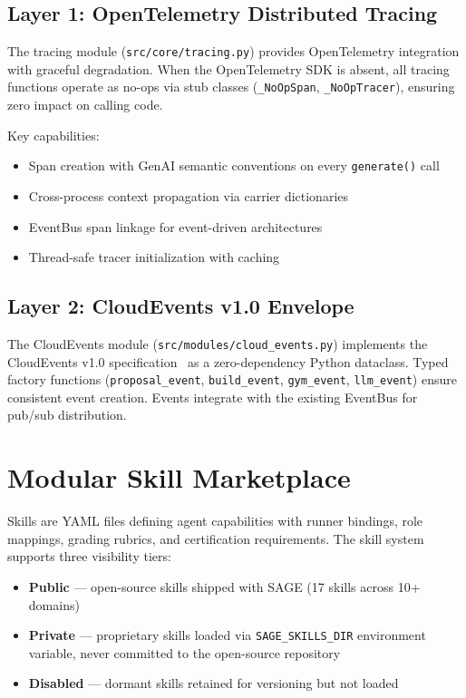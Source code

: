 \documentclass[11pt,a4paper]{article}
\begin{document}
\subsection{Layer 1: OpenTelemetry Distributed Tracing}

The tracing module (\texttt{src/core/tracing.py}) provides OpenTelemetry integration with graceful degradation. When the OpenTelemetry SDK is absent, all tracing functions operate as no-ops via stub classes (\texttt{\_NoOpSpan}, \texttt{\_NoOpTracer}), ensuring zero impact on calling code.

Key capabilities:
\begin{itemize}[noitemsep]
    \item Span creation with GenAI semantic conventions on every \texttt{generate()} call
    \item Cross-process context propagation via carrier dictionaries
    \item EventBus span linkage for event-driven architectures
    \item Thread-safe tracer initialization with caching
\end{itemize}

\subsection{Layer 2: CloudEvents v1.0 Envelope}

The CloudEvents module (\texttt{src/modules/cloud\_events.py}) implements the CloudEvents v1.0 specification~\citep{cloudevents2024} as a zero-dependency Python dataclass. Typed factory functions (\texttt{proposal\_event}, \texttt{build\_event}, \texttt{gym\_event}, \texttt{llm\_event}) ensure consistent event creation. Events integrate with the existing EventBus for pub/sub distribution.

\section{Modular Skill Marketplace}
\label{sec:skills}

Skills are YAML files defining agent capabilities with runner bindings, role mappings, grading rubrics, and certification requirements. The skill system supports three visibility tiers:

\begin{itemize}[noitemsep]
    \item \textbf{Public} --- open-source skills shipped with SAGE (17 skills across 10+ domains)
    \item \textbf{Private} --- proprietary skills loaded via \texttt{SAGE\_SKILLS\_DIR} environment variable, never committed to the open-source repository
    \item \textbf{Disabled} --- dormant skills retained for versioning but not loaded
\end{itemize}
\end{document}
